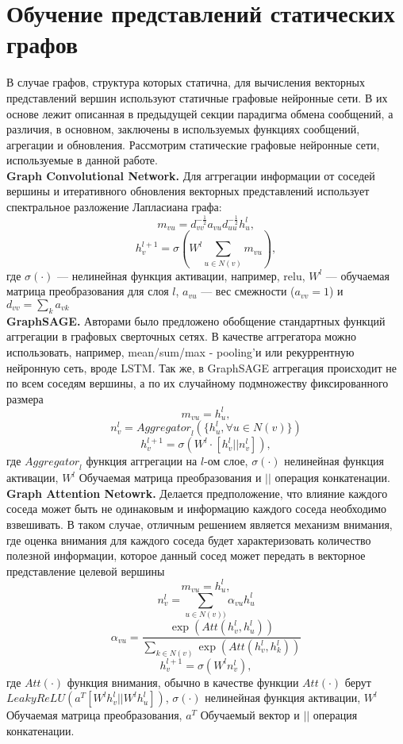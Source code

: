 \documentclass{mipt-thesis-ms}
\begin{document}
\section{Обучение представлений статических графов}
В случае графов, структура которых статична, для вычисления векторных представлений вершин используют статичные графовые нейронные сети. В их основе лежит описанная в предыдущей секции парадигма обмена сообщений, а различия, в основном, заключены в используемых функциях сообщений, агрегации и обновления. Рассмотрим статические графовые нейронные сети, используемые в данной работе.\\

{\bf Graph Convolutional Network.} Для аггрегации информации от соседей вершины и итеративного обновления векторных представлений использует спектральное разложение Лапласиана графа:
$$m_{vu} = d_{vv}^{-\frac12}a_{vu}d_{uu}^{-\frac{1}{2}} h_u^l,$$
$$h_v^{l+1} = \sigma\left(W^l \sum_{u \in N(v)}m_{vu}\right),$$
где $\sigma(\cdot)$ --- нелинейная функция активации, например, relu, $W^l$ --- обучаемая матрица преобразования для слоя $l$, $a_{vu}$ --- вес смежности ($a_{vv} = 1$) и $d_{vv} = \sum_k a_{vk}$\\

{\bf GraphSAGE.} Авторами было предложено обобщение стандартных функций аггрегации в графовых сверточных сетях. В качестве аггрегатора можно использовать, например, mean/sum/max - pooling'и или рекуррентную нейронную сеть, вроде LSTM. Так же, в GraphSAGE аггрегация происходит не по всем соседям вершины, а по их случайному подмножеству фиксированного размера
$$m_{vu} = h_u^l,$$
$$n_v^l = {Aggregator}_l(\{h_u^l, \forall u \in N(v)\})$$
$$h_v^{l+1} = \sigma\left(W^l \cdot [h_v^l || n_v^l]\right),$$
где ${Aggregator}_l$ функция аггрегации на $l$-ом слое, $\sigma(\cdot)$ нелинейная функция активации, $W^l$ Обучаемая матрица преобразования и $||$ операция конкатенации.\\

{\bf Graph Attention Netowrk.} Делается предположение, что влияние каждого соседа может быть не одинаковым и информацию каждого соседа необходимо взвешивать. В таком случае, отличным решением является механизм внимания, где оценка внимания для каждого соседа будет характеризовать количество полезной информации, которое данный сосед может передать в векторное представление целевой вершины
$$m_{vu} = h_u^l,$$
$$n_v^l = \sum_{u \in N(v))}\alpha_{vu}h_u^l$$
$$\alpha_{vu} = \frac{\exp({Att}(h_v^l, h_u^l))}{\sum_{k \in N(v)} \exp({Att}(h_v^l, h_k^l))}$$
$$h_v^{l+1} = \sigma\left(W^l n_v^l\right),$$
где ${Att}(\cdot)$ функция внимания, обычно в качестве функции ${Att}(\cdot)$ берут ${LeakyReLU}(a^T[W^lh_v^l||W^lh_u^l])$, $\sigma(\cdot)$ нелинейная функция активации, $W^l$ Обучаемая матрица преобразования, $a^T$ Обучаемый вектор и $||$ операция конкатенации.
\end{document}
